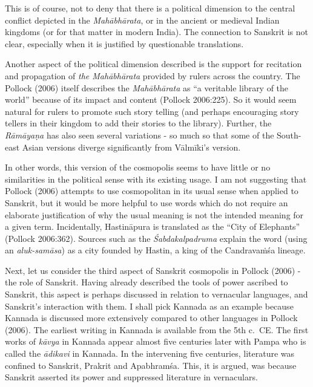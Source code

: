 This is of course, not to deny that there is a political dimension to the central conflict depicted in the {\sl Mahābhārata}, or in the ancient or medieval Indian kingdoms (or for that matter in modern India). The connection to Sanskrit is not clear, especially when it is justified by questionable translations.

Another aspect of the political dimension described is the support for recitation and propagation of {\sl the Mahābhārata} provided by rulers across the country. The Pollock (2006) itself describes the {\sl Mahābhārata} as “a veritable library of the world” because of its impact and content (Pollock 2006:225). So it would seem natural for rulers to promote such story telling (and perhaps encouraging story tellers in their kingdom to add their stories to the library).  Further, the {\sl Rāmāyaṇa} has also seen several variations - so much so that some of the South-east Asian versions diverge significantly from Vālmīki’s version. 

In other words, this version of the cosmopolis seems to have little or no similarities in the political sense with its existing usage. I am not suggesting that Pollock (2006) attempts to use cosmopolitan in its usual sense when applied to Sanskrit, but it would be more helpful to use words which do not require an elaborate justification of why the usual meaning is not the intended meaning for a given term. Incidentally, Hastināpura is translated as the “City of Elephants” (Pollock 2006:362). Sources such as the {\sl Śabdakalpadruma} explain the word (using an {\sl aluk-samāsa}) as a city founded by Hastin, a king of the Candravaṁśa lineage.

Next, let us consider the third aspect of Sanskrit cosmopolis in Pollock (2006) - the role of Sanskrit. Having already described the tools of power ascribed to Sanskrit, this aspect is perhaps discussed in relation to vernacular languages, and Sanskrit’s interaction with them. I shall pick Kannada as an example because Kannada is discussed more extensively compared to other languages in Pollock (2006). The earliest writing in Kannada is available from the 5th c.\ CE. The first works of {\sl kāvya} in Kannada appear almost five centuries later with Pampa who is called the {\sl ādikavi} in Kannada. In the intervening five centuries, literature was confined to Sanskrit, Prakrit and Apabhramśa. This, it is argued, was because Sanskrit asserted its power and suppressed literature in vernaculars.

